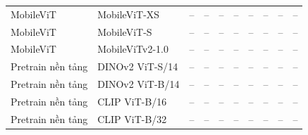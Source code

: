 \begin{table}[t]
\begin{tabular}{llcccccccc}
MobileViT & MobileViT-XS & – & – & – & – & – & – & – & – \\
MobileViT & MobileViT-S & – & – & – & – & – & – & – & – \\
MobileViT & MobileViTv2-1.0 & – & – & – & – & – & – & – & – \\
Pretrain nền tảng & DINOv2 ViT-S/14 & – & – & – & – & – & – & – & – \\
Pretrain nền tảng & DINOv2 ViT-B/14 & – & – & – & – & – & – & – & – \\
Pretrain nền tảng & CLIP ViT-B/16 & – & – & – & – & – & – & – & – \\
Pretrain nền tảng & CLIP ViT-B/32 & – & – & – & – & – & – & – & – \\
\bottomrule
\end{tabular}
\end{table}
